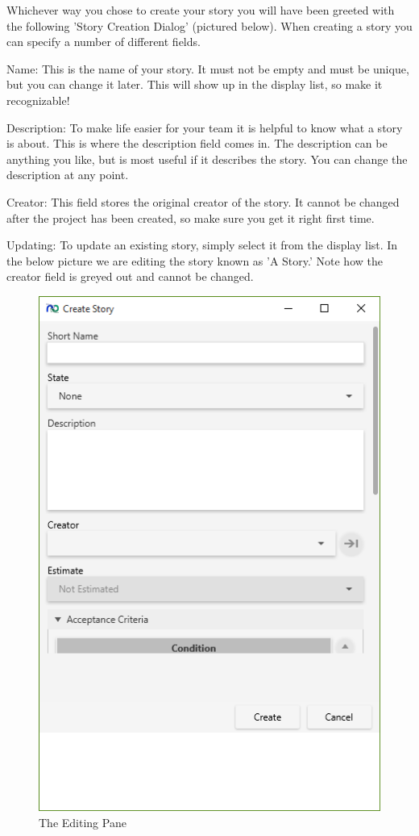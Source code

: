 Whichever way you chose to create your story you will have been greeted with the following 'Story Creation Dialog' (pictured below). When creating a story you can specify a number of different fields. 

Name:
This is the name of your story. It must not be empty and must be unique, but you can change it later. This will show up in the display list, so make it recognizable!

Description:
To make life easier for your team it is helpful to know what a story is about. This is where the description field comes in. The description can be anything you like, but is most useful if it describes the story. You can change the description at any point.

Creator:
This field stores the original creator of the story. It cannot be changed after the project has been created, so make sure you get it right first time.

Updating:
To update an existing story, simply select it from the display list. In the below picture we are editing the story known as 'A Story.' Note how the creator field is greyed out and cannot be changed.

\begin{figure}[H]
\centering
\includegraphics[width=\textwidth]{images/screenshots/stories3.PNG}
\caption{The Editing Pane}
\label{fig:new_project}
\end{figure}

